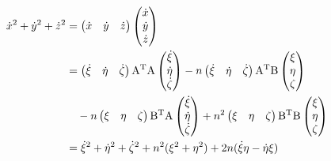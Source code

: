 \documentclass[11pt,a4paper,oneside,onecolumn]{jreport}
\begin{document}
\begin{equation}
\begin{split}
\dot{x}^2 + \dot{y}^2 + \dot{z}^2 & = 
\begin{pmatrix}
\dot{x} & \dot{y} & \dot{z}\\
\end{pmatrix}
\begin{pmatrix}
\dot{x}\\
\dot{y}\\
\dot{z}\\
\end{pmatrix}\\
& = 
\begin{pmatrix}
\dot{\xi} & \dot{\eta} & \dot{\zeta}\\
\end{pmatrix}
{\rm A}^{\rm T} {\rm A} 
\begin{pmatrix}
\dot{\xi}\\
\dot{\eta}\\
\dot{\zeta}\\
\end{pmatrix}
- n
\begin{pmatrix}
\dot{\xi} & \dot{\eta} & \dot{\zeta}\\
\end{pmatrix}
{\rm A}^{\rm T} {\rm B} 
\begin{pmatrix}
\xi\\
\eta\\
\zeta\\
\end{pmatrix}\\
& \quad - n
\begin{pmatrix}
\xi & \eta & \zeta\\
\end{pmatrix}
{\rm B}^{\rm T} {\rm A}
 \begin{pmatrix}
\dot{\xi}\\
\dot{\eta}\\
\dot{\zeta}\\
\end{pmatrix}
+ n^2 
\begin{pmatrix}
\xi & \eta & \zeta\\
\end{pmatrix}
{\rm B}^{\rm T} {\rm B}
\begin{pmatrix}
\xi\\
\eta\\
\zeta\\
\end{pmatrix}\\
& =  \dot{\xi}^2 + \dot{\eta}^2 + \dot{\zeta}^2 + n^2 (\xi^2 + \eta^2) + 2 n (\dot{\xi} \eta - \dot{\eta} \xi)
\end{split}
\end{equation}
\end{document}
